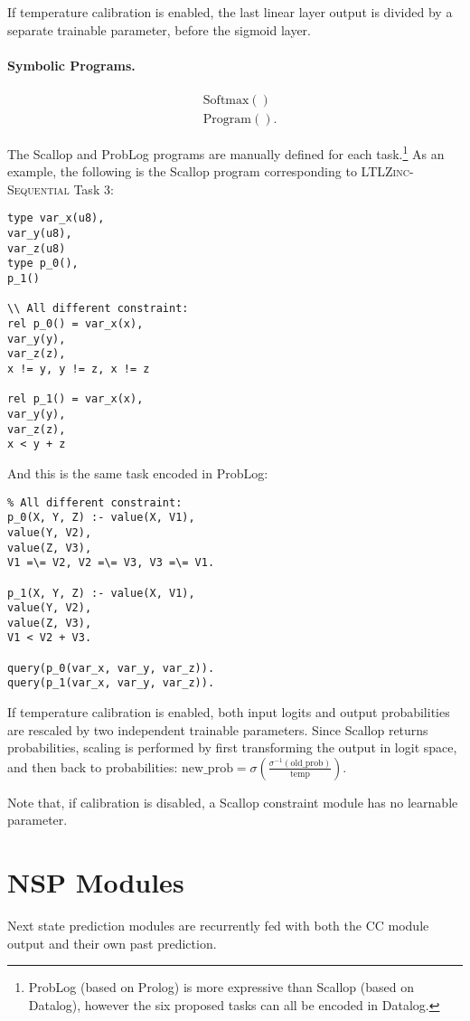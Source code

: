 If temperature calibration is enabled, the last linear layer output is divided by a separate trainable parameter, before the sigmoid layer.

\paragraph{Symbolic Programs.}

\begin{align*}
	&\mathrm{Softmax()}\\
	&\mathrm{Program()}.
\end{align*}


The Scallop and ProbLog programs are manually defined for each task.\footnote{ProbLog (based on Prolog) is more expressive than Scallop (based on Datalog), however the six proposed tasks can all be encoded in Datalog.} As an example, the following is the Scallop program corresponding to \textsc{LTLZinc-Sequential} Task 3:
\begin{verbatim}
type var_x(u8), 
var_y(u8), 
var_z(u8)
type p_0(), 
p_1()

\\ All different constraint:
rel p_0() = var_x(x), 
var_y(y), 
var_z(z), 
x != y, y != z, x != z

rel p_1() = var_x(x), 
var_y(y), 
var_z(z), 
x < y + z
\end{verbatim}

And this is the same task encoded in ProbLog:
\begin{verbatim}
% All different constraint:
p_0(X, Y, Z) :- value(X, V1),
value(Y, V2), 
value(Z, V3), 
V1 =\= V2, V2 =\= V3, V3 =\= V1.

p_1(X, Y, Z) :- value(X, V1), 
value(Y, V2), 
value(Z, V3), 
V1 < V2 + V3.

query(p_0(var_x, var_y, var_z)).
query(p_1(var_x, var_y, var_z)).
\end{verbatim}

If temperature calibration is enabled, both input logits and output probabilities are rescaled by two independent trainable parameters. Since Scallop returns probabilities, scaling is performed by first transforming the output in logit space, and then back to probabilities: $\mathrm{new\_prob} = \sigma(\frac{\sigma^{-1}(\mathrm{old\_prob})}{\mathrm{temp}})$.

Note that, if calibration is disabled, a Scallop constraint module has no learnable parameter.

\section{\textsc{NSP} Modules}\label{app:nextstate}
Next state prediction modules are recurrently fed with both the \textsc{CC} module output and their own past prediction.

